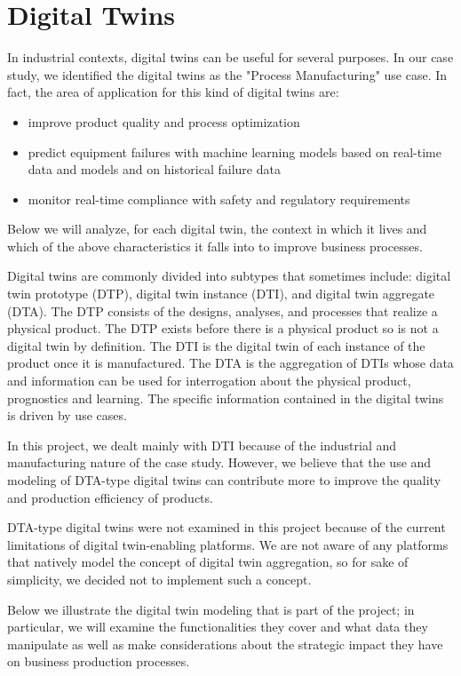 \chapter{Digital Twins}
In industrial contexts, digital twins can be useful for several purposes.
In our case study, we identified the digital twins as the "Process Manufacturing" use case.
In fact, the area of application for this kind of digital twins are:
\begin{itemize}
	\item improve product quality and process optimization
	\item predict equipment failures with machine learning models based on real-time data and models and on historical failure data
	\item monitor real-time compliance with safety and regulatory requirements
\end{itemize}
Below we will analyze, for each digital twin, the context in which it lives and which of the above characteristics it falls into to improve business processes.

Digital twins are commonly divided into subtypes that sometimes include: digital twin prototype (DTP), digital twin instance (DTI), and digital twin aggregate (DTA).
The DTP consists of the designs, analyses, and processes that realize a physical product.
The DTP exists before there is a physical product so is not a digital twin by definition.
The DTI is the digital twin of each instance of the product once it is manufactured.
The DTA is the aggregation of DTIs whose data and information can be used for interrogation about the physical product, prognostics and learning.
The specific information contained in the digital twins is driven by use cases.

In this project, we dealt mainly with DTI because of the industrial and manufacturing nature of the case study.
However, we believe that the use and modeling of DTA-type digital twins can contribute more to improve the quality and production efficiency of products.

DTA-type digital twins were not examined in this project because of the current limitations of digital twin-enabling platforms.
We are not aware of any platforms that natively model the concept of digital twin aggregation, so for sake of simplicity, we decided not to implement such a concept.

Below we illustrate the digital twin modeling that is part of the project; in particular, we will examine the functionalities they cover and what data they
manipulate as well as make considerations about the strategic impact they have on business production processes.

